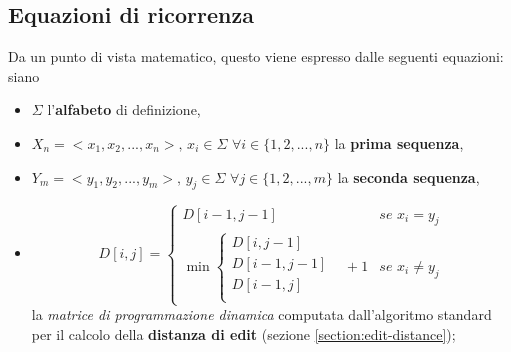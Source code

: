 \subsection{Equazioni di ricorrenza}
    Da un punto di vista matematico, questo viene espresso dalle seguenti equazioni: siano

    \begin{itemize}
        \item $\Sigma$ l'\textbf{alfabeto} di definizione,
        \item  $X_n = <x_1, x_2, ..., x_n>, \, x_i \in \Sigma \, \, \forall i \in \{1, 2, ..., n\}$ la \textbf{prima sequenza},
        \item  $Y_m = <y_1, y_2, ..., y_m>, \, y_j \in \Sigma \, \, \forall j \in \{1, 2, ..., m\}$ la \textbf{seconda sequenza},
        \item $$D[i, j] = \begin{cases}
            D[i-1, j-1] & se \, \, x_i = y_j \\
            \min \begin{cases}
                D[i, j-1] & \\
                D[i-1, j-1] & \\
                D[i-1, j] & \\
            \end{cases} + 1 & se \, \, x_i \neq y_j 
        \end{cases}$$ la \emph{matrice di programmazione dinamica} computata dall'algoritmo standard per il calcolo della \textbf{distanza di edit} (sezione \ref{section:edit-distance});
    \end{itemize}


